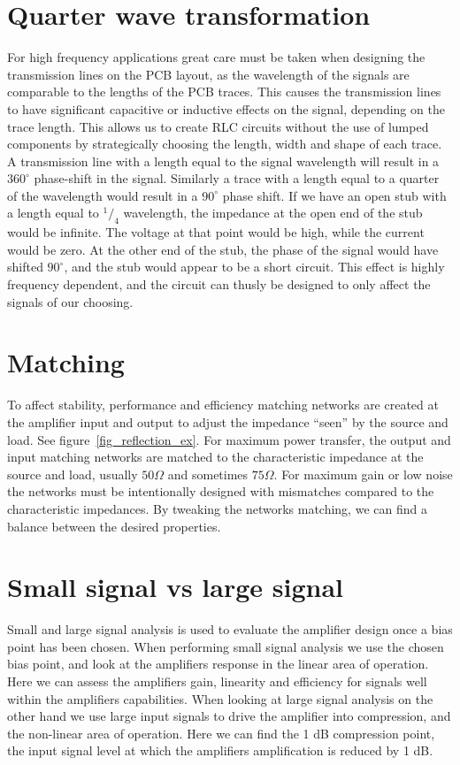 \section{Quarter wave transformation}
For high frequency applications great care must be taken when designing the transmission lines on the PCB layout, as the wavelength of the signals are comparable to the lengths of the PCB traces. This causes the transmission lines to have significant capacitive or inductive effects on the signal, depending on the trace length. This allows us to create RLC circuits without the use of lumped components by strategically choosing the length, width and shape of each trace. A transmission line with a length equal to the signal wavelength will result in a $360^\circ$ phase-shift in the signal. Similarly a trace with a length equal to a quarter of the wavelength would result in a $90^\circ$ phase shift. If we have an open stub with a length equal to $^1/_4$ wavelength, the impedance at the open end of the stub would be infinite. The voltage at that point would be high, while the current would be zero. At the other end of the stub, the phase of the signal would have shifted  $90^\circ$, and the stub would appear to be a short circuit. This effect is highly frequency dependent, and the circuit can thusly be designed to only affect the signals of our choosing.
\section{Matching}
To affect stability, performance and efficiency matching networks are created at the amplifier input and output to adjust the impedance “seen” by the source and load. See figure~\ref{fig_reflection_ex}. For maximum power transfer, the output and input matching networks are matched to the characteristic impedance at the source and load, usually $50\Omega$ and sometimes $75\Omega$. For maximum gain or low noise the networks must be intentionally designed with mismatches compared to the characteristic impedances. By tweaking the networks matching, we can find a balance between the desired properties.

\section{Small signal vs large signal}
Small and large signal analysis is used to evaluate the amplifier design once a bias point has been chosen. When performing small signal analysis we use the chosen bias point, and look at the amplifiers response in the linear area of operation. Here we can assess the amplifiers gain, linearity and efficiency for signals well within the amplifiers capabilities.
When looking at large signal analysis on the other hand we use large input signals to drive the amplifier into compression, and the non-linear area of operation. Here we can find the 1 dB compression point, the input signal level at which the amplifiers amplification is reduced by 1 dB.

